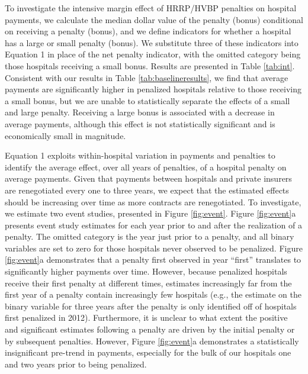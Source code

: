 \documentclass[12pt]{article}
\begin{document}
To investigate the intensive margin effect of HRRP/HVBP penalties on hospital payments, we calculate the median dollar value of the penalty (bonus) conditional on receiving a penalty (bonus), and we define indicators for whether a hospital has a large or small penalty (bonus).  We substitute three of these indicators into Equation 1 in place of the net penalty indicator, with the omitted category being those hospitals receiving a small bonus.  Results are presented in Table \ref{tab:int}.  Consistent with our results in Table \ref{tab:baselineresults}, we find that average payments are significantly higher in penalized hospitals relative to those receiving a small bonus, but we are unable to statistically separate the effects of a small and large penalty.  Receiving a large bonus is associated with a decrease in average payments, although this effect is not statistically significant and is economically small in magnitude.


Equation 1 exploits within-hospital variation in payments and penalties to identify the average effect, over all years of penalties, of a hospital penalty on average payments.  Given that payments between hospitals and private insurers are renegotiated every one to three years, we expect that the estimated effects should be increasing over time as more contracts are renegotiated.  To investigate, we estimate two event studies, presented in Figure \ref{fig:event}.  Figure \ref{fig:event}a presents event study estimates for each year prior to and after the realization of a penalty.  The omitted category is the year just prior to a penalty, and all binary variables are set to zero for those hospitals never observed to be penalized.  Figure \ref{fig:event}a demonstrates that a penalty first observed in year ``first'' translates to significantly higher payments over time.  However, because penalized hospitals receive their first penalty at different times, estimates increasingly far from the first year of a penalty contain increasingly few hospitals (e.g., the estimate on the binary variable for three years after the penalty is only identified off of hospitals first penalized in 2012).  Furthermore, it is unclear to what extent the positive and significant estimates following a penalty are driven by the initial penalty or by subsequent penalties.  However, Figure \ref{fig:event}a demonstrates a statistically insignificant pre-trend in payments, especially for the bulk of our hospitals one and two years prior to being penalized.
\end{document}
